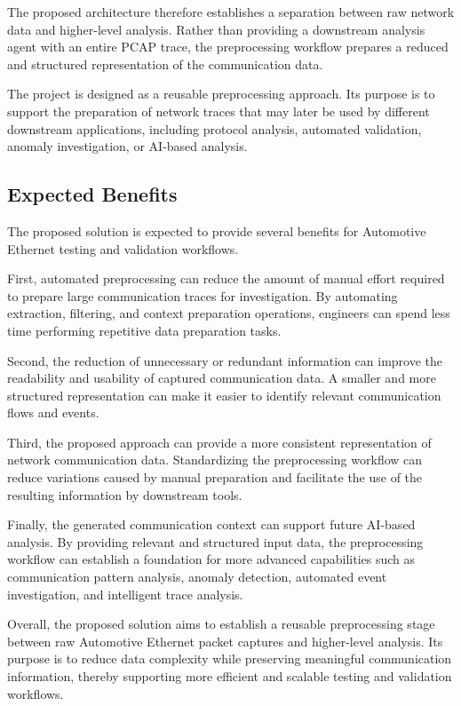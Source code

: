 The proposed architecture therefore establishes a separation between raw network data and higher-level analysis. Rather than providing a downstream analysis agent with an entire PCAP trace, the preprocessing workflow prepares a reduced and structured representation of the communication data.

The project is designed as a reusable preprocessing approach. Its purpose is to support the preparation of network traces that may later be used by different downstream applications, including protocol analysis, automated validation, anomaly investigation, or AI-based analysis.

\subsection{Expected Benefits}

The proposed solution is expected to provide several benefits for Automotive Ethernet testing and validation workflows.

First, automated preprocessing can reduce the amount of manual effort required to prepare large communication traces for investigation. By automating extraction, filtering, and context preparation operations, engineers can spend less time performing repetitive data preparation tasks.

Second, the reduction of unnecessary or redundant information can improve the readability and usability of captured communication data. A smaller and more structured representation can make it easier to identify relevant communication flows and events.

Third, the proposed approach can provide a more consistent representation of network communication data. Standardizing the preprocessing workflow can reduce variations caused by manual preparation and facilitate the use of the resulting information by downstream tools.

Finally, the generated communication context can support future AI-based analysis. By providing relevant and structured input data, the preprocessing workflow can establish a foundation for more advanced capabilities such as communication pattern analysis, anomaly detection, automated event investigation, and intelligent trace analysis.

Overall, the proposed solution aims to establish a reusable preprocessing stage between raw Automotive Ethernet packet captures and higher-level analysis. Its purpose is to reduce data complexity while preserving meaningful communication information, thereby supporting more efficient and scalable testing and validation workflows.